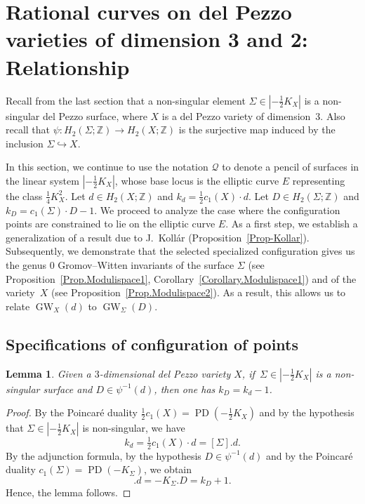 \documentclass[10pt,a4paper]{article}
\numberwithin{equation}{section}
\theoremstyle{definition}
\theoremstyle{plain}
\newtheorem{lemma}[definition]{Lemma}
\theoremstyle{remark}
\DeclareMathOperator{\GW}{GW}
\newcommand{\PD}{\operatorname{PD}}
\begin{document}
\section{Rational curves on del Pezzo varieties of dimension 3 and 2: Relationship } \label{Section-ratcurve}
Recall from the last section that a non-singular element $\Sigma\in |-\frac{1}{2}K_X|$ is a non-singular del Pezzo surface, where $X$ is a del Pezzo variety of dimension~$3$. Also recall  that $\psi\colon  H_2(\Sigma;\mathbb{Z})\to H_2(X;\mathbb{Z})$ is the surjective map induced by the inclusion $\Sigma\hookrightarrow X$.

 
 
 In this section, we continue to use the notation $\mathcal{Q}$ to denote a pencil of surfaces in the linear system $|-\frac{1}{2}K_X|$, whose base locus is the elliptic curve $E$ representing the class $\frac{1}{4}K_X^2$.  Let $d\in H_2(X;\mathbb{Z})$ and $k_d=\frac{1}{2}c_1(X)\cdot d$. Let $D\in H_2(\Sigma;\mathbb{Z})$ and $k_D=c_1(\Sigma)\cdot D-1$. We proceed to analyze the case where the configuration points are constrained to lie on the elliptic curve $E$. As a first step, we  establish a generalization of a result due to J.~Koll\'ar (Proposition~\ref{Prop-Kollar}). Subsequently, we demonstrate that the selected specialized configuration gives us the genus $0$ Gromov--Witten invariants of the surface $\Sigma$ (see Proposition~\ref{Prop.Modulispace1}, Corollary~\ref{Corollary.Modulispace1}) and of the variety~$X$ (see Proposition~\ref{Prop.Modulispace2}). As a result, this allows us to relate $\GW_X(d)$ to $\GW_\Sigma(D)$.

\subsection{Specifications of configuration of points} \label{SectionSpecificationConfiguration}
 \begin{lemma} \label{lemkDandkd}
Given a $3$-dimensional del Pezzo variety $X$, if\,  $\Sigma\in |-\frac{1}{2}K_X|$ is a non-singular surface and $D\in \psi^{-1}(d)$, then one has $k_D=k_d-1$. 
\end{lemma}

 \begin{proof}
   By the Poincar\'e duality $\tfrac{1}{2}c_1(X)=\PD(-\tfrac{1}{2}K_X)$ and by the hypothesis that $\Sigma\in |-\tfrac{1}{2}K_X|$ is non-singular, we have
   $$k_d=\tfrac{1}{2}c_1(X)\cdot d=[\Sigma]. d .$$
By the adjunction formula, by the hypothesis $D\in \psi^{-1}(d)$ 
and by the Poincar\'e duality $c_1(\Sigma) =\PD(-K_\Sigma)$, we obtain
\begin{equation*}
[\Sigma].d=-K_\Sigma.D=k_D+1.
\end{equation*}
Hence, the lemma follows. 
\end{proof}
\end{document}
